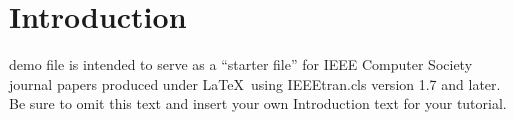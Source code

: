 \documentclass[12pt,journal,compsoc]{IEEEtran}
\begin{document}
\section{Introduction}
%
%



% 
% 
% 
% 

 demo file is intended to serve as a ``starter file''
for IEEE Computer Society journal papers produced under \LaTeX\ using
IEEEtran.cls version 1.7 and later.
Be sure to omit this text and insert your own Introduction text for your tutorial.
 
\end{document}
